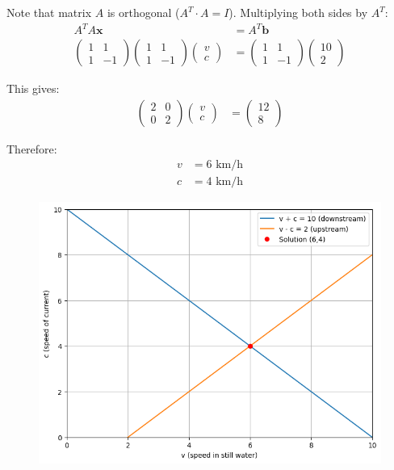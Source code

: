 \documentclass[journal]{IEEEtran}
\begin{document}
Note that matrix $A$ is orthogonal ($A^T \cdot A = I$). Multiplying both sides by $A^T$:
\begin{align*}
A^T A\mathbf{x} &= A^T\mathbf{b} \\
\begin{pmatrix}
1 & 1 \\
1 & -1
\end{pmatrix}
\begin{pmatrix}
1 & 1 \\
1 & -1
\end{pmatrix}
\begin{pmatrix}
v \\
c
\end{pmatrix} &= 
\begin{pmatrix}
1 & 1 \\
1 & -1
\end{pmatrix}
\begin{pmatrix}
10 \\
2
\end{pmatrix}
\end{align*}

This gives:
\begin{align*}
\begin{pmatrix}
2 & 0 \\
0 & 2
\end{pmatrix}
\begin{pmatrix}
v \\
c
\end{pmatrix} &= 
\begin{pmatrix}
12 \\
8
\end{pmatrix}
\end{align*}

Therefore:
\begin{align*}
v &= 6 \text{ km/h} \\
c &= 4 \text{ km/h}
\end{align*}
\begin{figure}[h]
    \centering
    \includegraphics[width=\textwidth]{figs/fig.png}
\end{figure}
\end{document}
